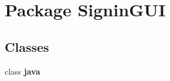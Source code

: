 \hypertarget{namespace_signin_g_u_i}{}\section{Package Signin\+G\+UI}
\label{namespace_signin_g_u_i}
\subsection*{Classes}
\begin{DoxyCompactItemize}
\item 
class {\bfseries java}
\end{DoxyCompactItemize}
